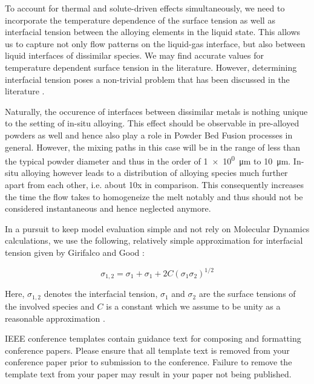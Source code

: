 \documentclass[conference,final]{IEEEtran}
\begin{document}
To account for thermal and solute-driven effects simultaneously, we need to incorporate the temperature dependence of the surface tension as well as interfacial tension between the alloying elements in the liquid state. This allows us to capture not only flow patterns on the liquid-gas interface, but also between liquid interfaces of dissimilar species. We may find accurate values for temperature dependent surface tension in the literature. However, determining interfacial tension poses a non-trivial problem that has been discussed in the literature \cite{marmurCorrelatingInterfacialTensions2010}.

Naturally, the occurence of interfaces between dissimilar metals is nothing unique to the setting of in-situ alloying. This effect should be observable in pre-alloyed powders as well and hence also play a role in Powder Bed Fusion processes in general. However, the mixing paths in this case will be in the range of less than the typical powder diameter and thus in the order of \SI[per-mode=fraction]{1e0}{\micro\metre} to \SI[per-mode=fraction]{10}{\micro\metre}. In-situ alloying however leads to a distribution of alloying species much further apart from each other, i.e. about 10x in comparison. This consequently increases the time the flow takes to homogeneize the melt notably and thus should not be considered instantaneous and hence neglected anymore.

In a pursuit to keep model evaluation simple and not rely on Molecular Dynamics calculations, we use the following, relatively simple approximation for interfacial tension given by Girifalco and Good \cite{girifalcoTheoryEstimationSurface1957}:

\begin{equation}
    \sigma_{1,2} = \sigma_1 + \sigma_1 + 2C (\sigma_1 \sigma_2)^{1/2}
\end{equation}

Here, $\sigma_{1,2}$ denotes the interfacial tension, $\sigma_1$ and $\sigma_2$ are the surface tensions of the involved species and $C$ is a constant which we assume to be unity as a reasonable approximation \cite{marmurCorrelatingInterfacialTensions2010}.


\vspace{12pt}
\color{red}
IEEE conference templates contain guidance text for composing and formatting conference papers. Please ensure that all template text is removed from your conference paper prior to submission to the conference. Failure to remove the template text from your paper may result in your paper not being published.
\end{document}
